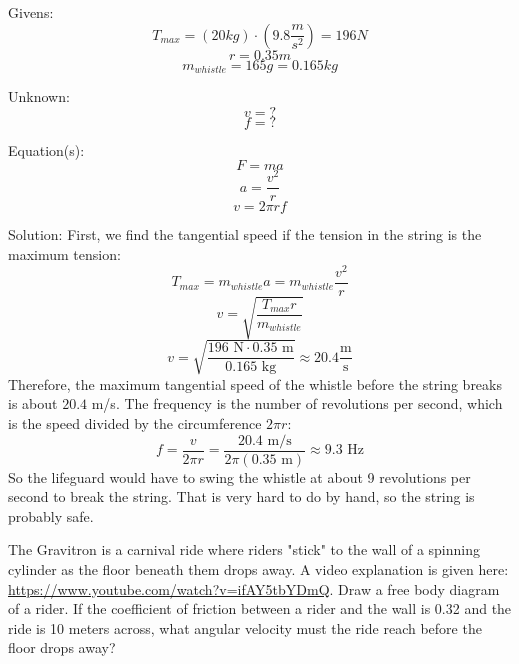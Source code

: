 \begin{Answer}[ref = whistle]
  Givens:
  $$T_{max} = \left( 20 kg \right) \cdot \left( 9.8 \frac{m}{s^2} \right) = 196 N$$
  $$r = 0.35 m$$
  $$m_{whistle} = 165 g = 0.165 kg$$

  Unknown:
  $$v = ?$$
  $$f = ?$$

  Equation(s):
  $$F = ma$$
  $$a = \frac{v^2}{r}$$
  $$v = 2\pi r f$$

  Solution:
  First, we find the tangential speed if the tension in the string is the maximum tension:
  $$T_{max} = m_{whistle}a = m_{whistle} \frac{v^2}{r}$$
  $$v = \sqrt{\frac{T_{max}r}{m_{whistle}}}$$
  $$v = \sqrt{\frac{196 \text{ N} \cdot 0.35 \text{ m}}{0.165 \text{ kg}}} \approx 20.4 \frac{\text{m}}{\text{s}}$$
Therefore, the maximum tangential speed of the whistle before the string breaks is about $20.4$ m/s. The frequency is the number of revolutions per second, which is the speed divided by the circumference $2\pi r$:
$$f = \frac{v}{2\pi r} = \frac{20.4 \text{ m/s}}{2\pi(0.35 \text{ m})} \approx 9.3 \text{ Hz}$$
So the lifeguard would have to swing the whistle at about 9 revolutions
per second to break the string. That is very hard to do by hand, so the
string is probably safe.
\end{Answer}

\begin{Exercise}[title = {The Gravitron}, label = gravitron]
  The Gravitron is a carnival ride where riders "stick" to the wall of a spinning cylinder as the floor beneath them drops away. A video explanation is given here: \url{https://www.youtube.com/watch?v=ifAY5tbYDmQ}. Draw a free body diagram of a rider. If the coefficient of friction between a rider and the wall is 0.32 and the ride is 10 meters across, what angular velocity must the ride reach before the floor drops away?
\end{Exercise}

